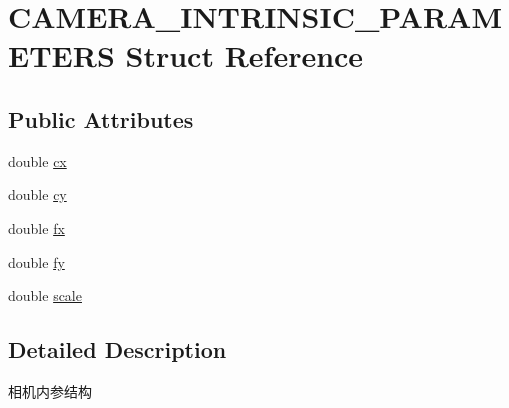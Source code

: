 \hypertarget{struct_c_a_m_e_r_a___i_n_t_r_i_n_s_i_c___p_a_r_a_m_e_t_e_r_s}{\section{C\-A\-M\-E\-R\-A\-\_\-\-I\-N\-T\-R\-I\-N\-S\-I\-C\-\_\-\-P\-A\-R\-A\-M\-E\-T\-E\-R\-S Struct Reference}
\label{struct_c_a_m_e_r_a___i_n_t_r_i_n_s_i_c___p_a_r_a_m_e_t_e_r_s}
}
\subsection*{Public Attributes}
\begin{DoxyCompactItemize}
\item 
double \hyperlink{struct_c_a_m_e_r_a___i_n_t_r_i_n_s_i_c___p_a_r_a_m_e_t_e_r_s_aca36cc7d83fd0e722236eb301adbca26}{cx}
\item 
double \hyperlink{struct_c_a_m_e_r_a___i_n_t_r_i_n_s_i_c___p_a_r_a_m_e_t_e_r_s_ab5869b30f9fff78df4f1408f01d54109}{cy}
\item 
double \hyperlink{struct_c_a_m_e_r_a___i_n_t_r_i_n_s_i_c___p_a_r_a_m_e_t_e_r_s_a5bbcaac98309d89768d080a2042fd212}{fx}
\item 
double \hyperlink{struct_c_a_m_e_r_a___i_n_t_r_i_n_s_i_c___p_a_r_a_m_e_t_e_r_s_a02f0af7d5baf32da452b7ddbd5ae5b2c}{fy}
\item 
double \hyperlink{struct_c_a_m_e_r_a___i_n_t_r_i_n_s_i_c___p_a_r_a_m_e_t_e_r_s_a8d97381ee4d6181c922ac00d84a80e93}{scale}
\end{DoxyCompactItemize}


\subsection{Detailed Description}
相机内参结构 

